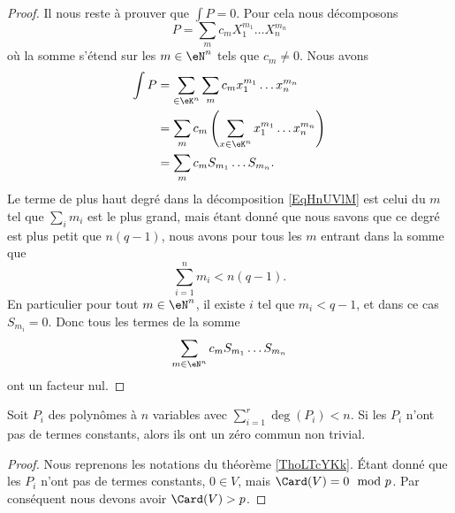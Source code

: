 \begin{proof}
    Il nous reste à prouver que \( \int P=0\). Pour cela nous décomposons 
    \begin{equation}        \label{EqHnUVlM}
        P=\sum_m c_mX_1^{m_1}\ldots X_n^{m_n}
    \end{equation}
    où la somme s'étend sur les \( m\in \eN^n\) tels que \( c_m\neq 0\). Nous avons
    \begin{subequations}
        \begin{align}
            \int P&=\sum_{\in \eK^n}\sum_mc_m x_1^{m_1}\ldots x_n^{m_n}\\
            &=\sum_{m}c_m\left( \sum_{x\in \eK^n}x_1^{m_1}\ldots x_n^{m_n} \right)\\
            &=\sum_m c_m S_{m_1}\ldots S_{m_n}.
        \end{align}
    \end{subequations}
    Le terme de plus haut degré dans la décomposition \eqref{EqHnUVlM} est celui du \( m\) tel que \( \sum_im_i\) est le plus grand, mais étant donné que nous savons que ce degré est plus petit que \( n(q-1)\), nous avons pour tous les \( m\) entrant dans la somme que
    \begin{equation}
        \sum_{i=1}^nm_i<n(q-1).
    \end{equation}
    En particulier pour tout \( m\in \eN^n\), il existe \( i\) tel que \( m_i<q-1\), et dans ce cas \( S_{m_i}=0\). Donc tous les termes de la somme
    \begin{equation}
        \sum_{m\in \eN^n}c_mS_{m_1}\ldots S_{m_n}
    \end{equation}
    ont un facteur nul.
\end{proof}

\begin{corollary}       \label{CorfuHNKz}
    Soit \( P_i\) des polynômes à \( n\) variables avec \( \sum_{i=1}^r\deg(P_i)<n\). Si les \( P_i\) n'ont pas de termes constants, alors ils ont un zéro commun non trivial.
\end{corollary}

\begin{proof}
    Nous reprenons les notations du théorème \ref{ThoLTcYKk}. Étant donné que les \( P_i\) n'ont pas de termes constants, \( 0\in V\), mais \( \Card(V)=0\mod p\). Par conséquent nous devons avoir \( \Card(V)>p\).
\end{proof}

